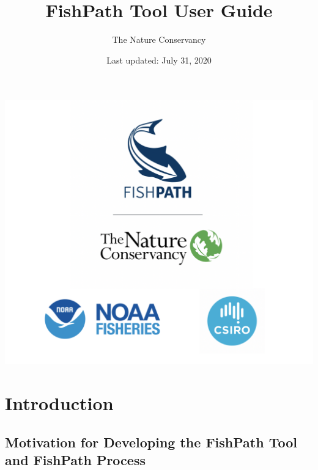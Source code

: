 \documentclass[
  11pt,
]{book}
\title{FishPath Tool User Guide}
\author{The Nature Conservancy}
\date{Last updated: July 31, 2020}
\begin{document}
\maketitle

{
\setcounter{tocdepth}{1}
\tableofcontents
}
\hypertarget{section}{%
\chapter*{}\label{section}}

\begin{center}\includegraphics[width=0.75\linewidth]{images/3-logos} \end{center}

\hypertarget{intro}{%
\chapter{Introduction}\label{intro}}

\hypertarget{motivation}{%
\section{Motivation for Developing the FishPath Tool and FishPath Process}\label{motivation}}
\end{document}

